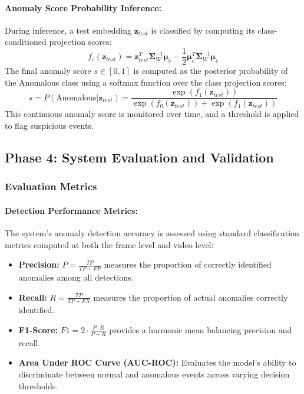 \documentclass[12pt]{article}
\begin{document}
\paragraph{Anomaly Score Probability Inference:}
During inference, a test embedding $\mathbf{z}_{test}$ is classified by computing its class-conditioned projection scores:
\[
f_c(\mathbf{z}_{test}) = \mathbf{z}_{test}^T \mathbf{\Sigma}_W^{-1} \boldsymbol{\mu}_c - \frac{1}{2} \boldsymbol{\mu}_c^T \mathbf{\Sigma}_W^{-1} \boldsymbol{\mu}_c
\]
The final anomaly score $s \in [0, 1]$ is computed as the posterior probability of the Anomalous class using a softmax function over the class projection scores:
\[
s = P(\text{Anomalous} | \mathbf{z}_{test}) = \frac{\exp(f_1(\mathbf{z}_{test}))}{\exp(f_0(\mathbf{z}_{test})) + \exp(f_1(\mathbf{z}_{test}))}
\]
This continuous anomaly score is monitored over time, and a threshold is applied to flag suspicious events.

\clearpage
\subsection{Phase 4: System Evaluation and Validation}

\subsubsection{Evaluation Metrics}

\paragraph{Detection Performance Metrics:}
The system's anomaly detection accuracy is assessed using standard classification metrics computed at both the frame level and video level:

\begin{itemize}
    \item \textbf{Precision:} $P = \frac{TP}{TP + FP}$ measures the proportion of correctly identified anomalies among all detections.
    \item \textbf{Recall:} $R = \frac{TP}{TP + FN}$ measures the proportion of actual anomalies correctly identified.
    \item \textbf{F1-Score:} $F1 = 2 \cdot \frac{P \cdot R}{P + R}$ provides a harmonic mean balancing precision and recall.
    \item \textbf{Area Under ROC Curve (AUC-ROC):} Evaluates the model's ability to discriminate between normal and anomalous events across varying decision thresholds.
\end{itemize}
\end{document}
